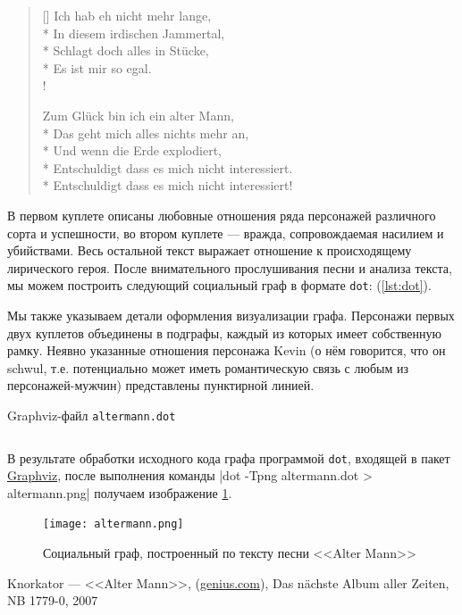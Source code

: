 \documentclass[a4paper,12pt,notitlepage]{article}
\begin{document}
\begin{verse}[\versewidth]
		Ich hab eh nicht mehr lange, \\*
		In diesem irdischen Jammertal, \\*
		Schlagt doch alles in Stücke, \\*
		Es ist mir so egal. \\!
		
		Zum Glück bin ich ein alter Mann, \\*
		Das geht mich alles nichts mehr an, \\*
		Und wenn die Erde explodiert, \\*
		Entschuldigt dass es mich nicht interessiert. \\*
		Entschuldigt dass es mich nicht interessiert! \\
  \end{verse}
  
  В первом куплете описаны любовные отношения ряда персонажей различного сорта и успешности, во втором куплете --- вражда, сопровождаемая насилием и убийствами. Весь остальной текст выражает отношение к происходящему лирического героя. После внимательного прослушивания песни и анализа текста, мы можем построить следующий социальный граф в формате \texttt{dot}: (\ref{lst:dot}).

	Мы также указываем детали оформления визуализации графа. Персонажи первых двух куплетов объединены в подграфы, каждый из которых имеет собственную рамку. Неявно указанные отношения персонажа Kevin (о нём говорится, что он schwul, т.е. потенциально может иметь романтическую связь с любым из персонажей-мужчин) представлены пунктирной линией.
  
  \begin{listing}[H]
    \caption{Graphviz-файл \texttt{altermann.dot}}
    \label{lst:dot}
    \inputminted[linenos,fontsize=\small]{dot}{altermann.dot}
  \end{listing}
    
  \newpage

  В результате обработки исходного кода графа программой \texttt{dot}, входящей в пакет \href{https://http://www.graphviz.org/}{Graphviz}, после выполнения команды |dot -Tpng altermann.dot > altermann.png| получаем изображение \ref{fig:graph}.
    
  \begin{figure}[ht]
    \centering
    \texttt{[image: altermann.png]}
    \caption{Социальный граф, построенный по тексту песни <<Alter Mann>>}
    \label{fig:graph}
  \end{figure}
    
  \newpage

  \listoflistings

  \listoffigures

  \begin{thebibliography}{1}
    Knorkator --- <<Alter Mann>>, (\href{https://genius.com/Knorkator-alter-mann-lyrics}{genius.com}), Das nächste Album aller Zeiten, NB 1779-0, 2007
  \end{thebibliography}
      
\end{document}
